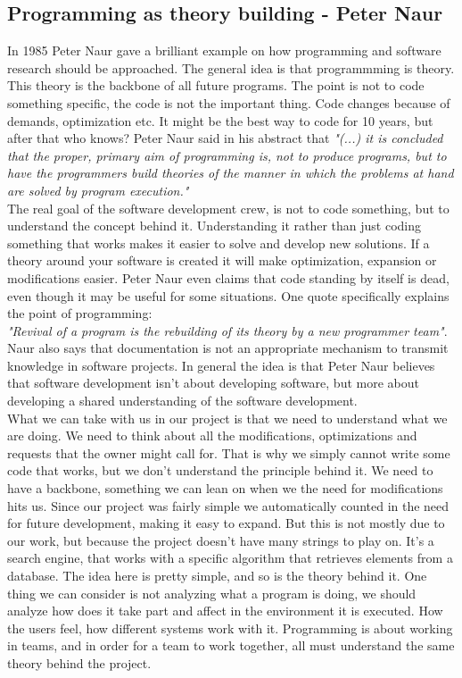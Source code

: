 \documentclass[12pt,a4paper]{article}
\begin{document}
\subsection{Programming as theory building - Peter Naur}
In 1985 Peter Naur gave a brilliant example on how programming and software research should be approached. The general idea is that programmming is theory. This theory is the backbone of all future programs. The point is not to code something specific, the code is not the important thing. Code changes because of demands, optimization etc. It might be the best way to code for 10 years, but after that who knows? Peter Naur said in his abstract that \textit{"(...) it is concluded that the proper, primary aim of programming is, not to produce programs, but to have the programmers build theories of the manner in which the problems at hand are solved by program execution."} \\
The real goal of the software development crew, is not to code something, but to understand the concept behind it. Understanding it rather than just coding something that works makes it easier to solve and develop new solutions. If a theory around your software is created it will make optimization, expansion or modifications easier. Peter Naur even claims that code standing by itself is dead, even though it may be useful for some situations. One quote specifically explains the point of programming:\\ \textit{"Revival of a program is the rebuilding of its theory by a new programmer team"}.\\
Naur also says that documentation is not an appropriate mechanism to transmit knowledge in software projects. In general the idea is that Peter Naur believes that software development isn't about developing software, but more about developing a shared understanding of the software development.
\\
What we can take with us in our project is that we need to understand what we are doing. We need to think about all the modifications, optimizations and requests that the owner might call for. That is why we simply cannot write some code that works, but we don't understand the principle behind it. We need to have a backbone, something we can lean on when we the need for modifications hits us. Since our project was fairly simple we automatically counted in the need for future development, making it easy to expand. But this is not mostly due to our work, but because the project doesn't have many strings to play on. It's a search engine, that works with a specific algorithm that retrieves elements from a database. The idea here is pretty simple, and so is the theory behind it. One thing we can consider is not analyzing what a program is doing, we should analyze how does it take part and affect in the environment it is executed. How the users feel, how different systems work with it. Programming is about working in teams, and in order for a team to work together, all must understand the same theory behind the project.
\newpage
\end{document}
